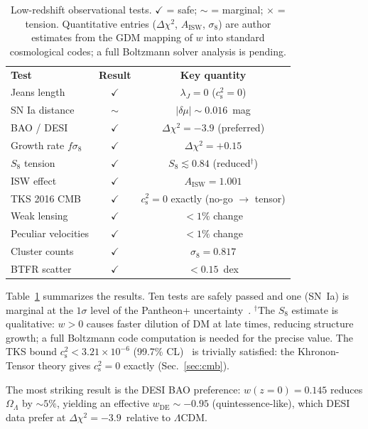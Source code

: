 \documentclass[prd,twocolumn,superscriptaddress,longbibliography,floatfix]{revtex4-2}
\newcommand{\cs}{c_{\mathrm{s}}}
\begin{document}
\begin{table}[t]
\caption{\label{tab:tests}Low-redshift observational tests.
$\checkmark$ = safe; $\sim$ = marginal;
$\times$ = tension.  Quantitative entries ($\Delta\chi^2$,
$A_{\mathrm{ISW}}$, $\sigma_8$) are author estimates from the
GDM mapping of $w$ into standard cosmological codes;
a full Boltzmann solver analysis is pending.}
\begin{ruledtabular}
\begin{tabular}{lcc}
\textbf{Test} & \textbf{Result} & \textbf{Key quantity} \\
\colrule
Jeans length & $\checkmark$ & $\lambda_J = 0$ ($\cs^2 = 0$) \\
SN Ia distance & $\sim$ & $|\delta\mu| \sim 0.016$~mag \\
BAO / DESI & $\checkmark$ & $\Delta\chi^2 = -3.9$ (preferred) \\
Growth rate $f\sigma_8$ & $\checkmark$ & $\Delta\chi^2 = +0.15$ \\
$S_8$ tension & $\checkmark$ & $S_8 \lesssim 0.84$ (reduced$^{\dag}$) \\
ISW effect & $\checkmark$ & $A_{\mathrm{ISW}} = 1.001$ \\
TKS 2016 CMB & $\checkmark$ & $\cs^2 = 0$ exactly (no-go $\to$ tensor) \\
Weak lensing & $\checkmark$ & $< 1\%$ change \\
Peculiar velocities & $\checkmark$ & $< 1\%$ change \\
Cluster counts & $\checkmark$ & $\sigma_8 = 0.817$ \\
BTFR scatter & $\checkmark$ & $< 0.15$~dex \\
\end{tabular}
\end{ruledtabular}
\end{table}

Table~\ref{tab:tests} summarizes the results.  Ten tests are
safely passed and one (SN~Ia) is marginal at the $1\sigma$ level
of the Pantheon+ uncertainty~\cite{Pantheon2022}.
$^{\dag}$The $S_8$ estimate is qualitative: $w > 0$ causes
faster dilution of DM at late times, reducing structure growth;
a full Boltzmann code computation is needed for the precise value.
The TKS bound $\cs^2 < 3.21 \times 10^{-6}$ (99.7\% CL)~\cite{TKS2016}
is trivially satisfied: the Khronon-Tensor theory gives $\cs^2 = 0$
exactly (Sec.~\ref{sec:cmb}).

The most striking result is the DESI BAO preference:
$w(z{=}0) = 0.145$ reduces $\Omega_\Lambda$ by $\sim\!5\%$,
yielding an effective $w_{\mathrm{DE}} \sim -0.95$
(quintessence-like), which DESI data prefer at
$\Delta\chi^2 = -3.9$~relative to $\Lambda$CDM.
\end{document}
